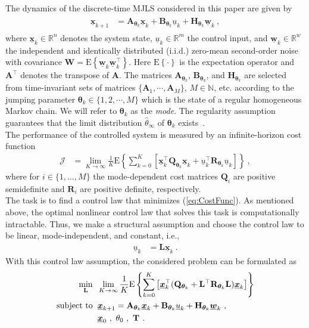 \documentclass[preprint,1p,11pt]{IR-Template/ISAS_IR}
\newcommand{\rv}[1]{\ensuremath{{\boldsymbol{#1}}}}
\newcommand{\nvec}[1]{\ensuremath{{{\underline{#1}}}}}
\newcommand{\rvec}[1]{\ensuremath{{\boldsymbol{\underline{#1}}}}}
\newcommand{\mat}[1]{{\ensuremath{{\mathbf{#1}}}}}
\newcommand{\tr}{^{\top}}
\newcommand{\expect}[1]{\mathrm{E}\left\lbrace #1 \right\rbrace}
\newcommand{\IN}{\mathbb{N}}  \newcommand{\IR}{\mathbb{R}}  \newcommand{\IC}{\mathbb{C}}
\DeclareMathOperator{\st}{subject\ to}
\newcommand{\bklammer}[1]{\left[ #1 \right]}
\newcommand{\Asys}[1]{\mat{A}_{#1}}
\newcommand{\Bsys}[1]{\mat{B}_{#1}}
\newcommand{\Qsys}[1]{\mat{Q}_{#1}}
\newcommand{\Rsys}[1]{\mat{R}_{#1}}
\newcommand{\Hsys}[1]{\mat{H}_{#1}}
\newcommand{\xsys}[1]{\rvec{x}_{#1}}
\newcommand{\usys}[1]{\nvec{u}_{#1}}
\newcommand{\wsys}[1]{\rvec{w}_{#1}}
\newcommand{\wCov}{\mat{W}}
\newcommand{\mode}[1]{\rv{\theta}_{#1}}
\newcommand{\modeis}[1]{\theta_{#1}}
\newcommand{\modeinf}{\widehat{\theta}_{\infty}}
\newcommand{\TransitionMatrix}[1]{\mat{T}_{#1}}
\newcommand{\ControlLaw}{\mat{L}}
\newcommand{\NumModes}{M}
\newcommand{\terT}{K}
\newcommand{\CostFunc}{\mathcal{J}}
\begin{document}
The dynamics of the discrete-time MJLS considered in this paper are given by
\begin{align}
\begin{aligned}
\xsys{k+1}
	&=
	\Asys{\mode{k}}\xsys{k} + \Bsys{\mode{k}}\usys{k} + \Hsys{\mode{k}}\wsys{k}\ ,
\end{aligned}
\label{eq:SystemDynamics}
\end{align}
where $\xsys{k}\in\IR^n$ denotes the system state, $\usys{k}\in\IR^m$ the control input, and $\wsys{k}\in\IR^w$ the independent and identically distributed (i.i.d.) zero-mean second-order noise with covariance $\wCov = \expect{\wsys{k}\wsys{k}\tr}$. Here $\expect{\cdot}$ is the expectation operator and $\mat{A}\tr$ denotes the transpose of $\mat{A}$. The matrices $\Asys{\mode{k}}$, $\Bsys{\mode{k}}$, and $\Hsys{\mode{k}}$ are selected from time-invariant sets of matrices $\{\Asys{1},\cdots,\Asys{\NumModes}\}$, $\NumModes\in\IN$, etc. according to the jumping parameter $\mode{k}\in\{1,2,\cdots,\NumModes\}$ which is the state of a regular homogeneous Markov chain. We will refer to $\mode{k}$ as the \emph{mode}. The regularity assumption guarantees that the limit distribution $\modeinf$ of $\mode{k}$ exists~\cite{Grinstead_2003}.\\

The performance of the controlled system is measured by an infinite-horizon cost function
\begin{align}
\CostFunc
	&=
	\lim\limits_{\terT\rightarrow\infty} \frac{1}{\terT} \expect{\sum\limits_{k=0}^{\terT} \bklammer{\xsys{k}\tr\Qsys{\mode{k}}\xsys{k} + \usys{k}\tr\Rsys{\mode{k}}\usys{k}}}\ ,
\label{eq:CostFunc}
\end{align}
where for $i\in\{1,\dots,\NumModes\}$ the mode-dependent cost matrices $\Qsys{i}$ are positive semidefinite and $\Rsys{i}$ are positive definite, respectively.\\

The task is to find a control law that minimizes (\ref{eq:CostFunc}). As mentioned above, the optimal nonlinear control law that solves this task is computationally intractable. Thus, we make a structural assumption and choose the control law to be linear, mode-independent, and constant, i.e.,
\begin{align*}
\usys{k}
	&=
	\ControlLaw\xsys{k}\ .
\end{align*}
With this control law assumption, the considered problem can be formulated as
\begin{align}
\begin{aligned}
\min\limits_\ControlLaw&\hspace{2mm} \lim\limits_{\terT\rightarrow\infty} \frac{1}{\terT} \expect{\sum\limits_{k=0}^{\terT} \bklammer{\xsys{k}\tr(\Qsys{\mode{k}}+\ControlLaw\tr\Rsys{\mode{k}}\ControlLaw)\xsys{k}}} \\
\st&\hspace{2mm}
	\xsys{k+1} = \Asys{\mode{k}}\xsys{k} + \Bsys{\mode{k}}\usys{k} + \Hsys{\mode{k}}\wsys{k}\ ,\\
	&\hspace{2mm}\xsys{0}\ ,\ \modeis{0}\ ,\ \TransitionMatrix{}\ .
\end{aligned}
\label{eq:OptimizationProblem}
\end{align}
\end{document}
